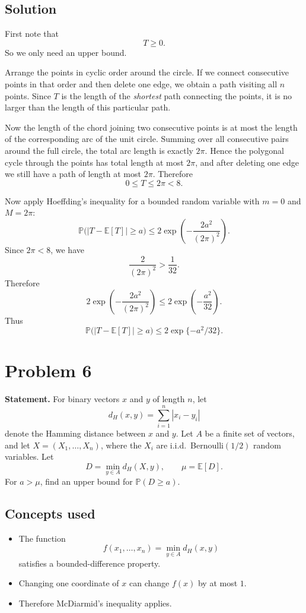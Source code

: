 \documentclass[11pt]{article}
\newcommand{\EE}{\mathbb{E}}
\newcommand{\PP}{\mathbb{P}}
\begin{document}
\subsection*{Solution}

First note that
\[
T\ge 0.
\]
So we only need an upper bound.

Arrange the points in cyclic order around the circle. If we connect consecutive points in that
order and then delete one edge, we obtain a path visiting all $n$ points. Since $T$ is the
length of the \emph{shortest} path connecting the points, it is no larger than the length of
this particular path.

Now the length of the chord joining two consecutive points is at most the length of the
corresponding arc of the unit circle. Summing over all consecutive pairs around the full
circle, the total arc length is exactly $2\pi$. Hence the polygonal cycle through the points
has total length at most $2\pi$, and after deleting one edge we still have a path of length at
most $2\pi$. Therefore
\[
0\le T\le 2\pi < 8.
\]

Now apply Hoeffding's inequality for a bounded random variable with $m=0$ and $M=2\pi$:
\[
\PP\bigl(|T-\EE[T]|\ge a\bigr)
\le
2\exp\!\left(-\frac{2a^2}{(2\pi)^2}\right).
\]
Since $2\pi<8$, we have
\[
\frac{2}{(2\pi)^2} > \frac{1}{32}.
\]
Therefore
\[
2\exp\!\left(-\frac{2a^2}{(2\pi)^2}\right)
\le
2\exp\!\left(-\frac{a^2}{32}\right).
\]
Thus
\[
\PP\bigl(|T-\EE[T]|\ge a\bigr)\le 2\exp\{-a^2/32\}.
\]

\section*{Problem 6}

\textbf{Statement.} For binary vectors $x$ and $y$ of length $n$, let
\[
d_H(x,y)=\sum_{i=1}^n |x_i-y_i|
\]
denote the Hamming distance between $x$ and $y$. Let $A$ be a finite set of vectors, and let
$X=(X_1,\dots,X_n)$, where the $X_i$ are i.i.d.\ Bernoulli$(1/2)$ random variables. Let
\[
D=\min_{y\in A} d_H(X,y),
\qquad
\mu=\EE[D].
\]
For $a>\mu$, find an upper bound for $\PP(D\ge a)$.

\subsection*{Concepts used}

\begin{itemize}
\item The function
      \[
      f(x_1,\dots,x_n)=\min_{y\in A} d_H(x,y)
      \]
      satisfies a bounded-difference property.
\item Changing one coordinate of $x$ can change $f(x)$ by at most $1$.
\item Therefore McDiarmid's inequality applies.
\end{itemize}
\end{document}
